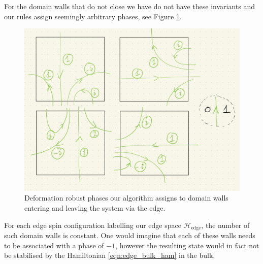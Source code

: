\documentclass[a4paper,twocolumn,11pt]{quantumarticle}
\begin{document}
For the domain walls that do not close we have do not have these invariants and our rules assign seemingly arbitrary phases, see Figure \ref{fig:edge_wall_phases}.
\begin{figure}
\centering
\includegraphics[width=\linewidth]{Figures/edge_wall_phases.png}
\caption{Deformation robust phases our algorithm assigns to domain walls entering and leaving the system via the edge.}
\label{fig:edge_wall_phases}
\end{figure}
For each edge spin configuration labelling our edge space $\mathcal{H}_{\text{edge}}$, the number of such domain walls is constant.
One would imagine that each of these walls needs to be associated with a phase of $-1$, however the resulting state would in fact not be stabilised by the Hamiltonian \eqref{eqn:edge_bulk_ham} in the bulk.
\end{document}
